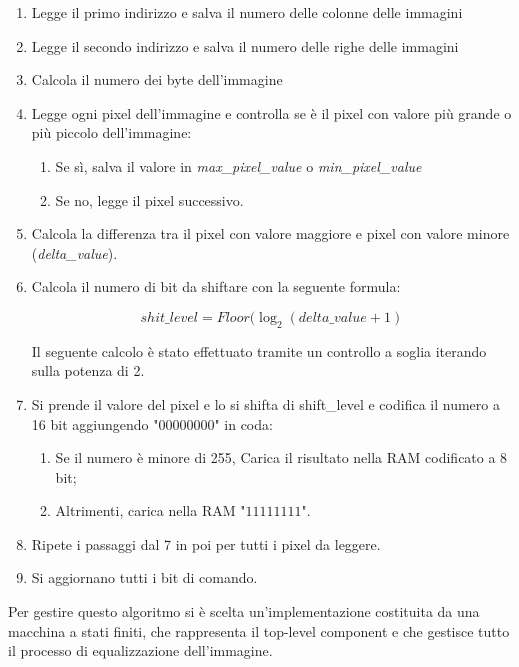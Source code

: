 \documentclass{article}
\begin{document}
\begin{enumerate}
\item Legge il primo indirizzo e salva il numero delle colonne delle immagini
\item Legge il secondo indirizzo e salva il numero delle righe delle immagini
\item Calcola il numero dei byte dell'immagine
\item Legge ogni pixel dell'immagine e controlla se è il pixel con valore più grande o più piccolo dell'immagine:
    \begin{enumerate}
        \item Se sì, salva il valore in \textit{max\_pixel\_value} o \textit{min\_pixel\_value}
        \item Se no, legge il pixel successivo.
    \end{enumerate}
\item Calcola la differenza tra il pixel con valore maggiore e pixel con valore minore (\textit{delta\_value}).
\item Calcola il numero di bit da shiftare con la seguente formula:

    \begin{equation}
        shit\_level = Floor(\log_2(delta\_value + 1)
    \end{equation}
    
    Il seguente calcolo è stato effettuato tramite un controllo a soglia iterando sulla potenza di 2.

\item Si prende il valore del pixel e lo si shifta di shift\_level e codifica il numero a 16 bit aggiungendo "$00000000$" in coda:
\begin{enumerate}
    \item Se il numero è minore di 255, Carica il risultato nella RAM codificato a 8 bit;
    \item Altrimenti, carica nella RAM "$11111111$".
\end{enumerate}


\item Ripete i passaggi dal 7 in poi per tutti i pixel da leggere.
\item Si aggiornano tutti i bit di comando.
\end{enumerate}

Per gestire questo algoritmo si è scelta un'implementazione costituita da una macchina a stati finiti, che rappresenta il top-level component
e che gestisce tutto il processo di equalizzazione dell'immagine.
\end{document}
